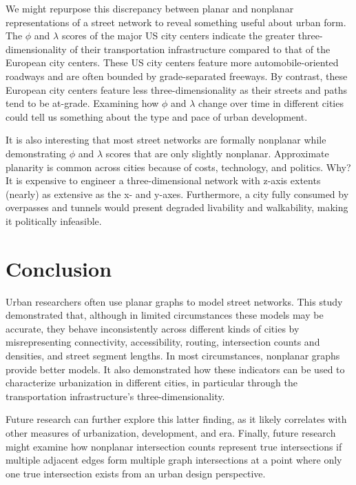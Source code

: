 \documentclass[Afour,sageh,times]{sagej}
\begin{document}
We might repurpose this discrepancy between planar and nonplanar representations of a street network to reveal something useful about urban form. The $\phi$ and $\lambda$ scores of the major US city centers indicate the greater three-dimensionality of their transportation infrastructure compared to that of the European city centers. These US city centers feature more automobile-oriented roadways and are often bounded by grade-separated freeways. By contrast, these European city centers feature less three-dimensionality as their streets and paths tend to be at-grade. Examining how $\phi$ and $\lambda$ change over time in different cities could tell us something about the type and pace of urban development. 

It is also interesting that most street networks are formally nonplanar while demonstrating $\phi$ and $\lambda$ scores that are only slightly nonplanar. Approximate planarity is common across cities because of costs, technology, and politics. Why? It is expensive to engineer a three-dimensional network with z-axis extents (nearly) as extensive as the x- and y-axes. Furthermore, a city fully consumed by overpasses and tunnels would present degraded livability and walkability, making it politically infeasible.

\section{Conclusion}

Urban researchers often use planar graphs to model street networks. This study demonstrated that, although in limited circumstances these models may be accurate, they behave inconsistently across different kinds of cities by misrepresenting connectivity, accessibility, routing, intersection counts and densities, and street segment lengths. In most circumstances, nonplanar graphs provide better models. It also demonstrated how these indicators can be used to characterize urbanization in different cities, in particular through the transportation infrastructure's three-dimensionality.

Future research can further explore this latter finding, as it likely correlates with other measures of urbanization, development, and era. Finally, future research might examine how nonplanar intersection counts represent true intersections if multiple adjacent edges form multiple graph intersections at a point where only one true intersection exists from an urban design perspective.




\end{document}
